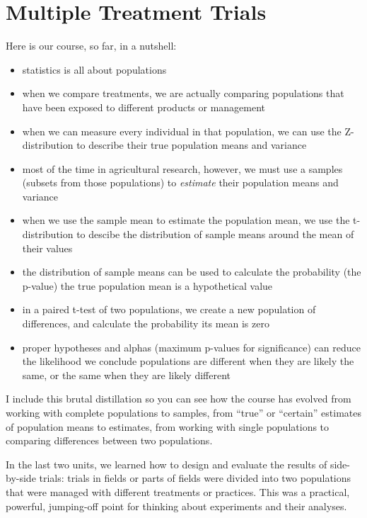 \documentclass[
]{book}
\providecommand{\tightlist}{%
  \setlength{\itemsep}{0pt}\setlength{\parskip}{0pt}}
\begin{document}
\hypertarget{multiple-treatment-trials}{%
\chapter{Multiple Treatment Trials}\label{multiple-treatment-trials}}

Here is our course, so far, in a nutshell:

\begin{itemize}
\tightlist
\item
  statistics is all about populations
\item
  when we compare treatments, we are actually comparing populations that have been exposed to different products or management
\item
  when we can measure every individual in that population, we can use the Z-distribution to describe their true population means and variance
\item
  most of the time in agricultural research, however, we must use a samples (subsets from those populations) to \emph{estimate} their population means and variance
\item
  when we use the sample mean to estimate the population mean, we use the t-distribution to descibe the distribution of sample means around the mean of their values
\item
  the distribution of sample means can be used to calculate the probability (the p-value) the true population mean is a hypothetical value
\item
  in a paired t-test of two populations, we create a new population of differences, and calculate the probability its mean is zero
\item
  proper hypotheses and alphas (maximum p-values for significance) can reduce the likelihood we conclude populations are different when they are likely the same, or the same when they are likely different
\end{itemize}

I include this brutal distillation so you can see how the course has evolved from working with complete populations to samples, from ``true'' or ``certain'' estimates of population means to estimates, from working with single populations to comparing differences between two populations.

In the last two units, we learned how to design and evaluate the results of side-by-side trials: trials in fields or parts of fields were divided into two populations that were managed with different treatments or practices. This was a practical, powerful, jumping-off point for thinking about experiments and their analyses.
\end{document}
